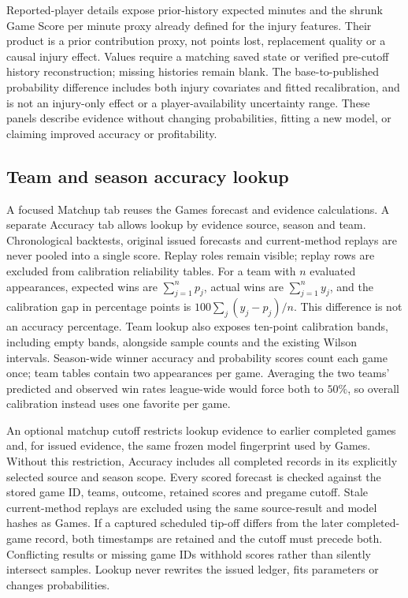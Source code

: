 \documentclass[11pt]{article}
\begin{document}
Reported-player details expose prior-history expected minutes and the
shrunk Game Score per minute proxy already defined for the injury features.
Their product is a prior contribution proxy, not points lost, replacement
quality or a causal injury effect. Values require a matching saved state
or verified pre-cutoff history reconstruction; missing histories remain
blank. The base-to-published probability difference includes both injury
covariates and fitted recalibration, and is not an injury-only effect or a
player-availability uncertainty range. These panels describe evidence
without changing probabilities, fitting a new model, or claiming improved
accuracy or profitability.

\subsection{Team and season accuracy lookup}
A focused Matchup tab reuses the Games forecast and evidence calculations.
A separate Accuracy tab allows lookup by evidence source, season and team.
Chronological backtests, original issued forecasts and current-method
replays are never pooled into a single score. Replay roles remain visible;
replay rows are excluded from calibration reliability tables. For a team
with $n$ evaluated appearances, expected wins are $\sum_{j=1}^n p_j$,
actual wins are $\sum_{j=1}^n y_j$, and the calibration gap in percentage
points is $100\sum_j(y_j-p_j)/n$. This difference is not an accuracy
percentage. Team lookup also exposes ten-point calibration bands, including
empty bands, alongside sample counts and the existing Wilson intervals.
Season-wide winner accuracy and probability scores count each game once;
team tables contain two appearances per game. Averaging the two teams'
predicted and observed win rates league-wide would force both to $50\%$,
so overall calibration instead uses one favorite per game.

An optional matchup cutoff restricts lookup evidence to earlier completed
games and, for issued evidence, the same frozen model fingerprint used by
Games. Without this restriction, Accuracy includes all completed records
in its explicitly selected source and season scope. Every scored forecast
is checked against the stored game ID, teams, outcome, retained scores and
pregame cutoff. Stale current-method replays are excluded using the same
source-result and model hashes as Games. If a captured scheduled tip-off
differs from the later completed-game record, both timestamps are retained
and the cutoff must precede both. Conflicting results or missing game IDs
withhold scores rather than silently intersect samples. Lookup never
rewrites the issued ledger, fits parameters or changes probabilities.
\end{document}
